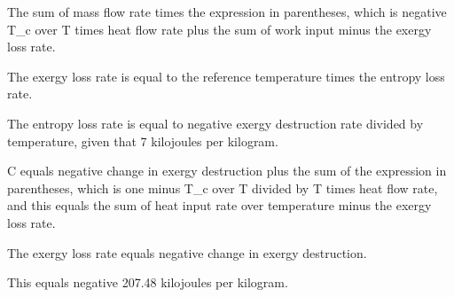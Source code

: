 The sum of mass flow rate times the expression in parentheses, which is negative T_c over T times heat flow rate plus the sum of work input minus the exergy loss rate.

The exergy loss rate is equal to the reference temperature times the entropy loss rate.

The entropy loss rate is equal to negative exergy destruction rate divided by temperature, given that 7 kilojoules per kilogram.

C equals negative change in exergy destruction plus the sum of the expression in parentheses, which is one minus T_c over T divided by T times heat flow rate, and this equals the sum of heat input rate over temperature minus the exergy loss rate.

The exergy loss rate equals negative change in exergy destruction.

This equals negative 207.48 kilojoules per kilogram.